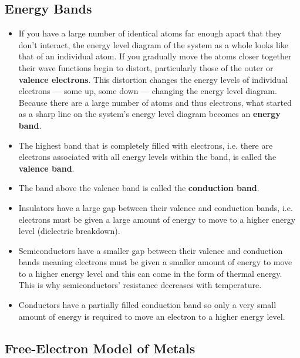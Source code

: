 \documentclass{article}
\begin{document}
\subsection{Energy Bands}

\begin{itemize}
  \item If you have a large number of identical atoms far enough apart that they don't interact, the energy level diagram of the system as a whole looks like that of an individual atom. If you gradually move the atoms closer together their wave functions begin to distort, particularly those of the outer or \textbf{valence electrons}. This distortion changes the energy levels of individual electrons — some up, some down — changing the energy level diagram. Because there are a large number of atoms and thus electrons, what started as a sharp line on the system's energy level diagram becomes an \textbf{energy band}.

  \item The highest band that is completely filled with electrons, i.e. there are electrons associated with all energy levels within the band, is called the \textbf{valence band}.

  \item The band above the valence band is called the \textbf{conduction band}.

  \item Insulators have a large gap between their valence and conduction bands, i.e. electrons must be given a large amount of energy to move to a higher energy level (dielectric breakdown).

  \item Semiconductors have a smaller gap between their valence and conduction bands meaning electrons must be given a smaller amount of energy to move to a higher energy level and this can come in the form of thermal energy. This is why semiconductors' resistance decreases with temperature.

  \item Conductors have a partially filled conduction band so only a very small amount of energy is required to move an electron to a higher energy level.
\end{itemize}

\subsection{Free-Electron Model of Metals}
\end{document}
